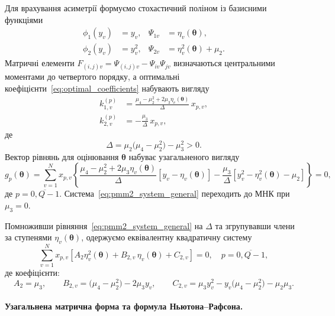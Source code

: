 \documentclass[12pt,a4paper]{article}
\begin{document}
Для врахування асиметрії формуємо стохастичний поліном із базисними функціями
\begin{align}
\phi_1(y_v) &= y_v, & \Psi_{1v} &= \eta_v(\boldsymbol{\theta}), \\
\phi_2(y_v) &= y_v^2, & \Psi_{2v} &= \eta_v^2(\boldsymbol{\theta}) + \mu_2.
\end{align}
Матричні елементи $F_{(i,j)v} = \Psi_{(i,j)v} - \Psi_{iv}\Psi_{jv}$ визначаються центральними моментами до четвертого порядку, а оптимальні коефіцієнти~\eqref{eq:optimal_coefficients} набувають вигляду
\begin{align}
\label{eq:pmm2_k1_general}
k_{1,v}^{(p)} &= \frac{\mu_4 - \mu_2^2 + 2\mu_3 \eta_v(\boldsymbol{\theta})}{\Delta} \, x_{p,v},\\
\label{eq:pmm2_k2_general}
k_{2,v}^{(p)} &= -\frac{\mu_3}{\Delta} \, x_{p,v},
\end{align}
де
\begin{equation}
\label{eq:delta_definition}
\Delta = \mu_2 \big(\mu_4 - \mu_2^2 \big) - \mu_3^2 > 0.
\end{equation}
Вектор рівнянь для оцінювання $\boldsymbol{\theta}$ набуває узагальненого вигляду
\begin{equation}
\label{eq:pmm2_system_general}
g_p(\boldsymbol{\theta}) = \sum_{v=1}^{N} x_{p,v} \left\{ \frac{\mu_4 - \mu_2^2 + 2\mu_3 \eta_v(\boldsymbol{\theta})}{\Delta} \left[ y_v - \eta_v(\boldsymbol{\theta}) \right] - \frac{\mu_3}{\Delta} \left[ y_v^2 - \eta_v^2(\boldsymbol{\theta}) - \mu_2 \right] \right\} = 0,
\end{equation}
де $p = \overline{0,Q-1}$. Система~\eqref{eq:pmm2_system_general} переходить до МНК при $\mu_3 = 0$.

Помноживши рівняння~\eqref{eq:pmm2_system_general} на $\Delta$ та згрупувавши члени за ступенями $\eta_v(\boldsymbol{\theta})$, одержуємо еквівалентну квадратичну систему
\begin{equation}
\label{eq:pmm2_quadratic_form}
\sum_{v=1}^{N} x_{p,v} \left[ A_2 \eta_v^2(\boldsymbol{\theta}) + B_{2,v}\,\eta_v(\boldsymbol{\theta}) + C_{2,v} \right] = 0,\quad p = \overline{0,Q-1},
\end{equation}
де коефіцієнти:
\begin{equation}
\label{eq:pmm2_coeffs}
A_2 = \mu_3,\qquad B_{2,v} = \big(\mu_4 - \mu_2^2\big) - 2\mu_3 y_v,\qquad C_{2,v} = \mu_3 y_v^2 - y_v \big(\mu_4 - \mu_2^2\big) - \mu_2 \mu_3.
\end{equation}

\paragraph{Узагальнена матрична форма та формула Ньютона--Рафсона.}
\end{document}
